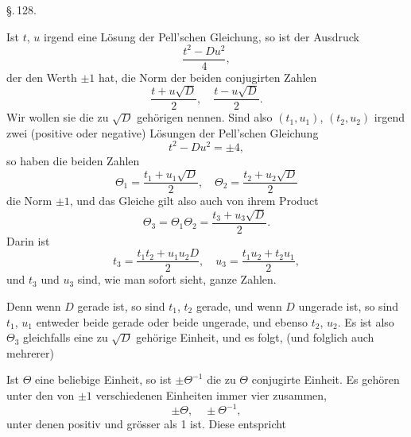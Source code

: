 \begin{center}
\S.\,128.

\end{center}

Ist $t$, $u$ irgend eine Lösung der Pell'schen Gleichung, so
ist der Ausdruck
\[
\frac{t^2 - D u^2}{4},
\]
der den Werth $\pm 1$ hat, die Norm der beiden conjugirten Zahlen
\[
\frac{t + u\sqrt{D}}{2}, \quad \frac{t - u\sqrt{D}}{2}.
\]
Wir wollen sie die zu $\sqrt{D}$ gehörigen  nennen.
Sind also $(t_1, u_1)$, $(t_2, u_2)$ irgend zwei (positive oder negative)
Lösungen der Pell'schen Gleichung
\[
t^2 - D u^2 = \pm 4,
\]
so haben die beiden Zahlen
\[
\Theta_1 = \frac{t_1 + u_1 \sqrt{D}}{2}, \quad \Theta_2 = \frac{t_2 + u_2 \sqrt{D}}{2}
\]
die Norm $\pm 1$, und das Gleiche gilt also auch von ihrem Product
\[
\Theta_3 = \Theta_1 \Theta_2 = \frac{t_3 + u_3 \sqrt{D}}{2}.
\]
Darin ist
\[
t_3 = \frac{t_1 t_2 + u_1 u_2 D}{2}, \quad u_3 = \frac{t_1 u_2 + t_2 u_1}{2},
\]
und $t_3$ und $u_3$ sind, wie man sofort sieht, ganze Zahlen.

Denn wenn $D$ gerade ist, so sind $t_1$, $t_2$ gerade, und wenn $D$
ungerade ist, so sind $t_1$, $u_1$ entweder beide gerade oder beide
ungerade, und ebenso $t_2$, $u_2$. Es ist also $\Theta_3$ gleichfalls eine zu
$\sqrt{D}$ gehörige Einheit, und es folgt, 
(und folglich auch mehrerer) 

Ist $\Theta$ eine beliebige Einheit, so ist $\pm \Theta^{-1}$ die zu $\Theta$ conjugirte
Einheit. Es gehören unter den von $\pm 1$ verschiedenen
Einheiten immer vier zusammen,
\[
\pm \Theta, \quad \pm \Theta^{-1},
\]
unter denen  positiv und grösser als 1 ist. Diese entspricht

